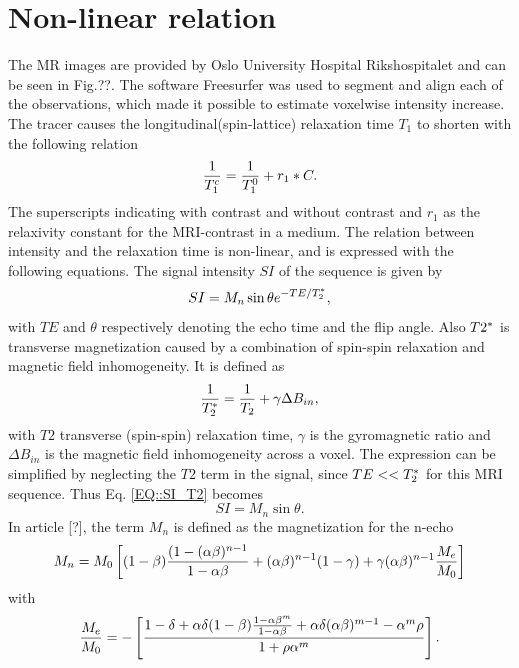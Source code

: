 \documentclass[11pt,a4paper]{article}
\begin{document}
\section*{Non-linear relation}
The MR images are provided by Oslo University Hospital Rikshospitalet and can be seen in Fig.??. The software Freesurfer was used to segment and align each of the observations, which made it possible to estimate voxelwise intensity increase. The tracer causes the longitudinal(spin-lattice) relaxation time $T_{1}$ to shorten with the following relation
\begin{equation}
\frac{1}{T_{1}\sp{c}} = \frac{1}{T_{1}\sp{0}} + r_{1}*C .
\label{EQ::contrast}
\end{equation}
The superscripts indicating with contrast and without contrast and $r_1$ as the relaxivity constant for the MRI-contrast in a medium. The relation between intensity and the relaxation time is non-linear, and is expressed with the following equations. The signal intensity $SI$ of the sequence is given by
\begin{equation}
SI = M_{n} \sin \theta e\sp{ - TE/T_2\sp{*} },
\label{EQ::SI_T2}
\end{equation}
with  $TE$ and $\theta$ respectively denoting the echo time and the flip angle. Also $T2\sp{*}$ is transverse magnetization caused by a combination of spin-spin relaxation and magnetic field inhomogeneity. It is defined as 
\begin{equation}
\frac{1}{T_2\sp{*}} = \frac{1}{T_2} + \gamma \Delta B_{in} ,
\end{equation}
with $T2$ transverse (spin-spin) relaxation time, $\gamma$ is the gyromagnetic ratio and $\Delta B_{in}$ is the magnetic field inhomogeneity across a voxel. The expression can be simplified by neglecting the $T2$ term in the signal, since $TE <<T_2\sp{*}$ for this MRI sequence. Thus Eq. \ref{EQ::SI_T2} becomes 
\begin{equation}
SI = M_{n} \sin \theta.
\label{EQ::SI}
\end{equation}
In article [?], the term $M_n$ is defined as the magnetization for the n-echo 
\begin{equation}
M_{n} = M_{0}  \left[ (1-\beta)\frac{(1-(\alpha \beta)\sp{n-1} }{1-\alpha\beta} + (\alpha \beta)\sp{n-1}(1-\gamma) + \gamma ( \alpha \beta)\sp{n-1} \frac{M_{e}}{M_{0}}  \right]   
\end{equation}
with 
\begin{equation}
\frac{M_{e}}{M_{0}} = - \left[ \frac{ 1 -\delta + \alpha \delta (1-\beta ) \frac{1-\alpha\beta\sp{m}}{1-\alpha \beta} + \alpha\delta(\alpha\beta)\sp{m-1} - \alpha\sp{m}\rho}{1 +\rho \alpha\sp{m} } \right].
\end{equation}
\end{document}
